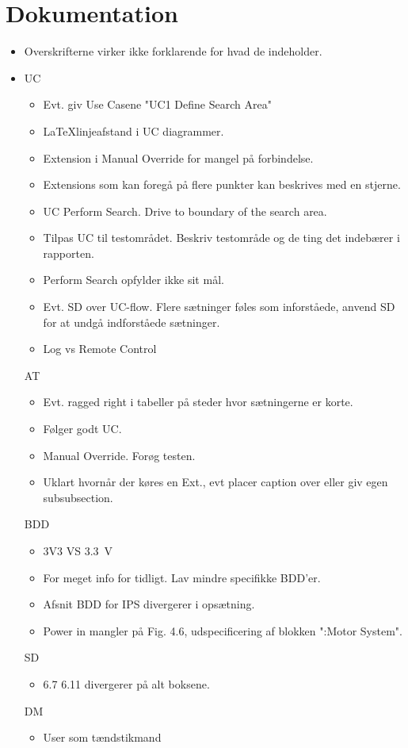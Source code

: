 \section{Dokumentation}
\begin{itemize}
	\item Overskrifterne virker ikke forklarende for hvad de indeholder.
	\item UC
	\begin{itemize}
		\item Evt. giv Use Casene "UC1 Define Search Area"
		\item \LaTeX linjeafstand i UC diagrammer.
		\item Extension i Manual Override for mangel på forbindelse.
		\item Extensions som kan foregå på flere punkter kan beskrives med en stjerne.
		\item UC Perform Search. Drive to boundary of the search area.
		\item Tilpas UC til testområdet. Beskriv testområde og de ting det indebærer i rapporten.
		\item Perform Search opfylder ikke sit mål.
		\item Evt. SD over UC-flow. Flere sætninger føles som inforståede, anvend SD for at undgå indforståede sætninger.
		\item Log vs Remote Control
	\end{itemize}
	AT
	\begin{itemize}
		\item Evt. ragged right i tabeller på steder hvor sætningerne er korte.
		\item Følger godt UC.
		\item Manual Override. Forøg testen.
		\item Uklart hvornår der køres en Ext., evt placer caption over eller giv egen subsubsection.
	\end{itemize}
	BDD
	\begin{itemize}
		\item 3V3 VS \SI{3.3}{\volt}
		\item For meget info for tidligt. Lav mindre specifikke BDD'er.
		\item Afsnit BDD for IPS divergerer i opsætning.
		\item Power in mangler på Fig. 4.6, udspecificering af blokken ":Motor System".
	\end{itemize}
	SD
	\begin{itemize}
		\item 6.7 6.11 divergerer på alt boksene.
	\end{itemize}
	DM
	\begin{itemize}
		\item User som tændstikmand
	\end{itemize}
\end{itemize}